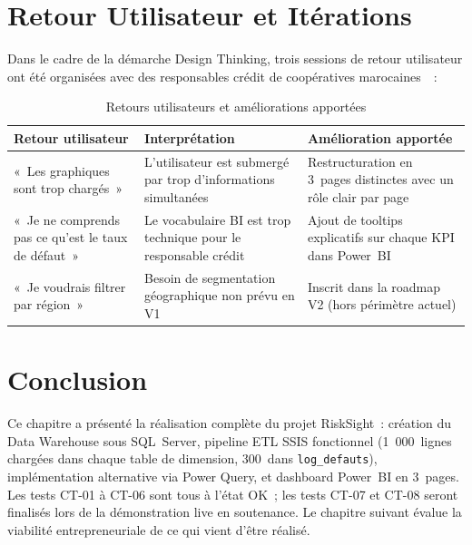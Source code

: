 \documentclass[12pt, a4paper]{report}
\begin{document}
\section{Retour Utilisateur et Itérations}

Dans le cadre de la démarche Design Thinking, trois sessions de retour
utilisateur ont été organisées avec des responsables crédit de coopératives
marocaines~\cite{prototype_slides}~:

\begin{table}[H]
\centering
\caption{Retours utilisateurs et améliorations apportées}
\label{tab:feedback}
\renewcommand{\arraystretch}{1.4}
\begin{tabularx}{\textwidth}{p{4cm} X p{4cm}}
\toprule
\rowcolor{primary!12}
Retour utilisateur & Interprétation & Amélioration apportée \\
\midrule
«~Les graphiques sont trop chargés~» & L'utilisateur est submergé par trop d'informations simultanées & Restructuration en 3~pages distinctes avec un rôle clair par page \\
«~Je ne comprends pas ce qu'est le taux de défaut~» & Le vocabulaire BI est trop technique pour le responsable crédit & Ajout de tooltips explicatifs sur chaque KPI dans Power~BI \\
«~Je voudrais filtrer par région~» & Besoin de segmentation géographique non prévu en V1 & Inscrit dans la roadmap V2 (hors périmètre actuel) \\
\bottomrule
\end{tabularx}
\end{table}

\section{Conclusion}

Ce chapitre a présenté la réalisation complète du projet RiskSight~:
création du Data Warehouse sous SQL~Server, pipeline ETL SSIS fonctionnel
(1~000~lignes chargées dans chaque table de dimension, 300~dans
\texttt{log\_defauts}), implémentation alternative via Power Query,
et dashboard Power~BI en 3~pages. Les tests CT-01 à CT-06 sont tous
à l'état OK~; les tests CT-07 et CT-08 seront finalisés lors de la
démonstration live en soutenance. Le chapitre suivant évalue la viabilité
entrepreneuriale de ce qui vient d'être réalisé.
\end{document}
